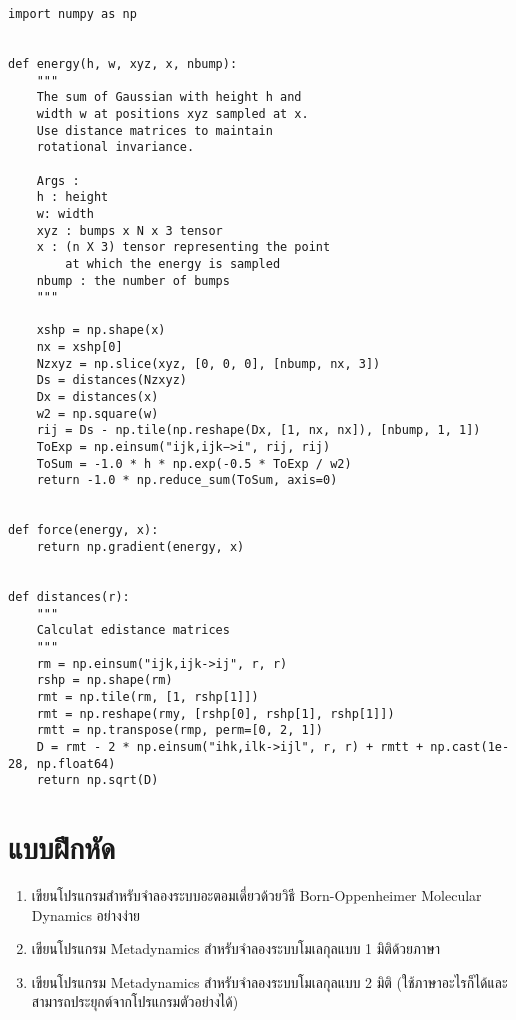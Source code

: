 \begin{lstlisting}[style=MyPython]
import numpy as np


def energy(h, w, xyz, x, nbump):
    """
    The sum of Gaussian with height h and
    width w at positions xyz sampled at x.
    Use distance matrices to maintain
    rotational invariance.

    Args :
    h : height
    w: width
    xyz : bumps x N x 3 tensor
    x : (n X 3) tensor representing the point
        at which the energy is sampled
    nbump : the number of bumps
    """

    xshp = np.shape(x)
    nx = xshp[0]
    Nzxyz = np.slice(xyz, [0, 0, 0], [nbump, nx, 3])
    Ds = distances(Nzxyz)
    Dx = distances(x)
    w2 = np.square(w)
    rij = Ds - np.tile(np.reshape(Dx, [1, nx, nx]), [nbump, 1, 1])
    ToExp = np.einsum("ijk,ijk−>i", rij, rij)
    ToSum = -1.0 * h * np.exp(-0.5 * ToExp / w2)
    return -1.0 * np.reduce_sum(ToSum, axis=0)


def force(energy, x):
    return np.gradient(energy, x)


def distances(r):
    """
    Calculat edistance matrices
    """
    rm = np.einsum("ijk,ijk->ij", r, r)
    rshp = np.shape(rm)
    rmt = np.tile(rm, [1, rshp[1]])
    rmt = np.reshape(rmy, [rshp[0], rshp[1], rshp[1]])
    rmtt = np.transpose(rmp, perm=[0, 2, 1])
    D = rmt - 2 * np.einsum("ihk,ilk->ijl", r, r) + rmtt + np.cast(1e-28, np.float64)
    return np.sqrt(D)
\end{lstlisting}

\vspace{5pt}

\section{แบบฝึกหัด}

\begin{enumerate}[topsep=0pt,noitemsep]
  \setlength\itemsep{1em}
  \item เขียนโปรแกรมสำหรับจำลองระบบอะตอมเดี่ยวด้วยวิธี Born-Oppenheimer Molecular Dynamics อย่างง่าย

  \item เขียนโปรแกรม Metadynamics สำหรับจำลองระบบโมเลกุลแบบ 1 มิติด้วยภาษา \cpp

  \item เขียนโปรแกรม Metadynamics สำหรับจำลองระบบโมเลกุลแบบ 2 มิติ (ใช้ภาษาอะไรก็ได้และสามารถประยุกต์จากโปรแกรมตัวอย่างได้)
\end{enumerate}
